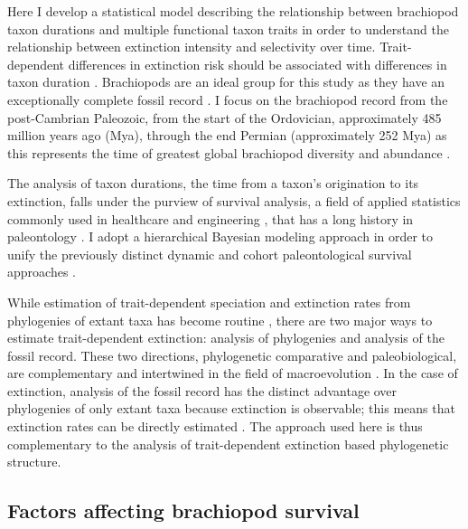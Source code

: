 \documentclass[11pt]{article}
\begin{document}
Here I develop a statistical model describing the relationship between brachiopod taxon durations and multiple functional taxon traits in order to understand the relationship between extinction intensity and selectivity over time. Trait-dependent differences in extinction risk should be associated with differences in taxon duration \citep{Cooper1984,Rabosky2010b}. Brachiopods are an ideal group for this study as they have an exceptionally complete fossil record \citep{Foote1996e,Foote2000a}. I focus on the brachiopod record from the post-Cambrian Paleozoic, from the start of the Ordovician, approximately 485 million years ago (Mya), through the end Permian (approximately 252 Mya) as this represents the time of greatest global brachiopod diversity and abundance \citep{Alroy2010}.

The analysis of taxon durations, the time from a taxon's origination to its extinction, falls under the purview of survival analysis, a field of applied statistics commonly used in healthcare and engineering \citep{Klein2003}, that has a long history in paleontology \citep{Simpson1944,Simpson1953,VanValen1973,VanValen1979,Smits2015,Crampton2016}. I adopt a hierarchical Bayesian modeling approach \citep{Gelman2007,Gelman2013d} in order to unify the previously distinct dynamic and cohort paleontological survival approaches \citep{VanValen1973,VanValen1979,Raup1978,Raup1975,Foote1988,Baumiller1993,Simpson2006,Crampton2016,Ezard2012b}. 

While estimation of trait-dependent speciation and extinction rates from phylogenies of extant taxa has become routine \citep{Maddison2007,Fitzjohn2010,Goldberg2011a,Goldberg2005,Rabosky2013,Stadler2013b,Stadler2011a,Stadler2013a}, there are two major ways to estimate trait-dependent extinction: analysis of phylogenies and analysis of the fossil record. These two directions, phylogenetic comparative and paleobiological, are complementary and intertwined in the field of macroevolution \citep{Rabosky2010b,Jablonski2008a,Hunt2014a}. In the case of extinction, analysis of the fossil record has the distinct advantage over phylogenies of only extant taxa because extinction is observable; this means that extinction rates can be directly estimated \citep{Rabosky2010a,Quental2009,Liow2010a}. The approach used here is thus complementary to the analysis of trait-dependent extinction based phylogenetic structure.

\subsection*{Factors affecting brachiopod survival}
\end{document}
